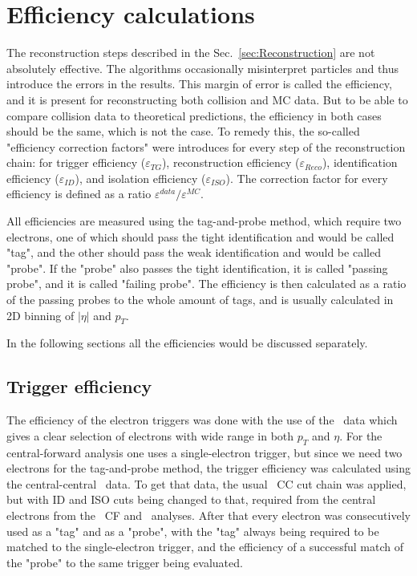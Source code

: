 \chapter{Efficiency calculations}
\label{sec:Efficiency}

The reconstruction steps described in the Sec.~\ref{sec:Reconstruction} are not absolutely effective. The algorithms occasionally misinterpret particles and thus introduce the errors in the results. This margin of error is called the efficiency, and it is present for reconstructing both collision and MC data. But to be able to compare collision data to theoretical predictions, the efficiency in both cases should be the same, which is not the case. To remedy this, the so-called "efficiency correction factors" were introduces for every step of the reconstruction chain: for trigger efficiency ($\varepsilon_{TG}$), reconstruction efficiency ($\varepsilon_{Reco}$), identification efficiency ($\varepsilon_{ID}$), and isolation efficiency ($\varepsilon_{ISO}$). The correction factor for every efficiency is defined as a ratio $\varepsilon^{data}/\varepsilon^{MC}$.

All efficiencies are measured using the tag-and-probe method, which require two electrons, one of which should pass the tight identification and would be called "tag", and the other should pass the weak identification and would be called "probe". If the "probe" also passes the tight identification, it is called "passing probe", and it is called "failing probe". The efficiency is then calculated as a ratio of the passing probes to the whole amount of tags, and is usually calculated in 2D binning of $|\eta|$ and $p_{T}$.

In the following sections all the efficiencies would be discussed separately.

\section{Trigger efficiency}

The efficiency of the electron triggers was done with the use of the \Zee\ data which gives a clear selection of electrons with wide range in both $p_{T}$ and $\eta$. For the central-forward analysis one uses a single-electron trigger, but since we need two electrons for the tag-and-probe method, the trigger efficiency was calculated using the central-central \Zee\ data. To get that data, the usual \Zee\ CC cut chain was applied, but with ID and ISO cuts being changed to that, required from the central electrons from the \Zee\ CF and \Wen\ analyses. After that every electron was consecutively used as a "tag" and as a "probe", with the "tag" always being required to be matched to the single-electron trigger, and the efficiency of a successful match of the "probe" to the same trigger being evaluated.

